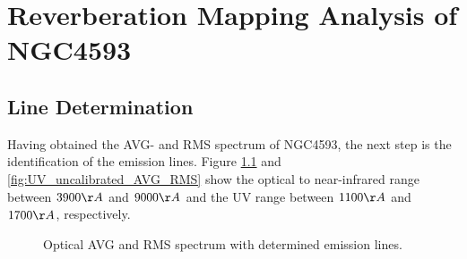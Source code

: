 \chapter{Reverberation Mapping Analysis of NGC4593}
\label{cap: Results}

\section{Line Determination}

Having obtained the AVG- and RMS spectrum of NGC4593, the next step is the identification of the emission lines. Figure \ref{fig:AVG_RMS_SPECTRUM} and \ref{fig:UV_uncalibrated_AVG_RMS} show the optical to near-infrared range between $3900 \AA$ and $9000 \AA$ and  the UV range between $1100 \AA$ and $1700 \AA$, respectively. 

\begin{figure}[!htbp]
	\centering
	\caption{Optical AVG and RMS spectrum with determined emission lines.}
	\label{fig:AVG_RMS_SPECTRUM}
\end{figure}

\newpage

